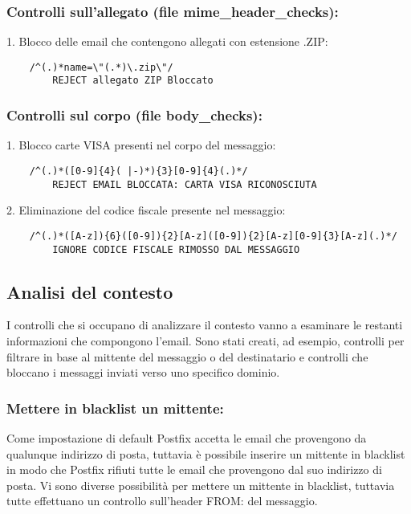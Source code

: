     \subsubsection{Controlli sull'allegato (file mime\_header\_checks):}

    1. Blocco delle email che contengono allegati con estensione .ZIP:

    \begin{verbatim}
    /^(.)*name=\"(.*)\.zip\"/
        REJECT allegato ZIP Bloccato
    \end{verbatim}

    \subsubsection{Controlli sul corpo (file body\_checks):}

    1. Blocco carte VISA presenti nel corpo del messaggio:
    \begin{verbatim}
    /^(.)*([0-9]{4}( |-)*){3}[0-9]{4}(.)*/
        REJECT EMAIL BLOCCATA: CARTA VISA RICONOSCIUTA
    \end{verbatim}
    2. Eliminazione del codice fiscale presente nel messaggio:
    \begin{verbatim}
    /^(.)*([A-z]){6}([0-9]){2}[A-z]([0-9]){2}[A-z][0-9]{3}[A-z](.)*/
        IGNORE CODICE FISCALE RIMOSSO DAL MESSAGGIO
    \end{verbatim}


    \subsection{Analisi del contesto}
    I controlli che si occupano di analizzare il contesto vanno a esaminare le restanti 
    informazioni che compongono l’email. Sono stati creati, ad esempio, controlli per filtrare in base al 
    mittente del messaggio o del destinatario e controlli che bloccano i messaggi inviati verso uno specifico dominio.

    \subsubsection{Mettere in blacklist un mittente:}
    Come impostazione di default Postfix accetta le email che provengono da qualunque indirizzo di posta, 
    tuttavia è possibile inserire un mittente in blacklist in modo che Postfix rifiuti tutte le email che 
    provengono dal suo indirizzo di posta. Vi sono diverse possibilità per mettere un mittente in blacklist, 
    tuttavia tutte effettuano un controllo sull’header FROM: del messaggio.

